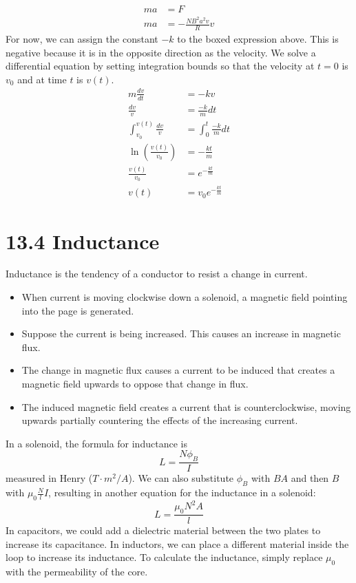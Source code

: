 \documentclass[12pt, titlepage]{article}
\begin{document}
\begin{align*}
    ma &= F \\
    ma &= \boxed{-\frac{NB^2a^2v}{R}}v
\end{align*}
For now, we can assign the constant $-k$ to the boxed expression above. This is negative because it is in the opposite direction as the velocity. We solve a differential equation by setting integration bounds so that the velocity at $t=0$ is $v_0$ and at time $t$ is $v(t)$.
\begin{align*}
    m\frac{dv}{dt} &= -kv \\
    \frac{dv}{v} &= \frac{-k}{m} dt \\
    \int_{v_0}^{v(t)} \frac{dv}{v} &= \int_{0}^{t} \frac{-k}{m}dt \\
    \ln (\frac{v(t)}{v_0})&=-\frac{kt}{m} \\
    \frac{v(t)}{v_0}&=e^{-\frac{kt}{m}} \\
    v(t) &= v_0e^{-\frac{kt}{m}}
\end{align*}

\section*{13.4 Inductance}

Inductance is the tendency of a conductor to resist a change in current.
\begin{itemize}
    \item When current is moving clockwise down a solenoid, a magnetic field pointing into the page is generated.
    \item Suppose the current is being increased. This causes an increase in magnetic flux.
    \item The change in magnetic flux causes a current to be induced that creates a magnetic field upwards to oppose that change in flux.
    \item The induced magnetic field creates a current that is counterclockwise, moving upwards partially countering the effects of the increasing current.
\end{itemize}
In a solenoid, the formula for inductance is
\begin{equation*}
    L=\frac{N\phi_B}{I}
\end{equation*}
measured in Henry ($T \cdot m^2/A$). We can also substitute $\phi_B$ with $BA$ and then $B$ with $\mu_0 \frac{N}{l}I$, resulting in another equation for the inductance in a solenoid:
\begin{equation*}
    L= \frac{\mu_0N^2A}{l}
\end{equation*}
In capacitors, we could add a dielectric material between the two plates to increase its capacitance. In inductors, we can place a different material inside the loop to increase its inductance. To calculate the inductance, simply replace $\mu_0$ with the permeability of the core.
\end{document}

